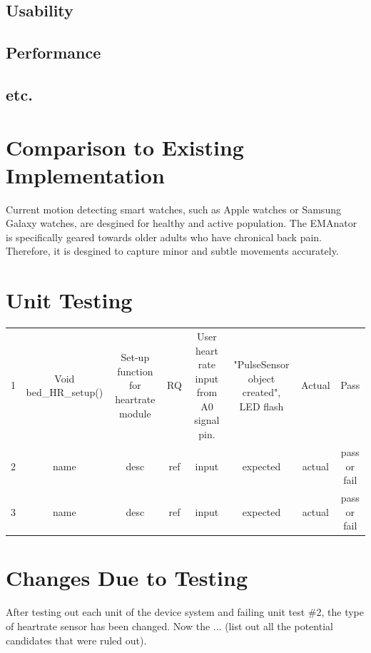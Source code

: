 \documentclass[12pt, titlepage]{article}
\begin{document}
\subsection{Usability}
		
\subsection{Performance}

\subsection{etc.}
	
\section{Comparison to Existing Implementation}	

Current motion detecting smart watches, such as Apple watches or Samsung Galaxy watches, are desgined for healthy and active population. The EMAnator is specifically geared towards older adults who have chronical back pain. Therefore, it is desgined to capture minor and subtle movements accurately.

\section{Unit Testing}

\begin{center}
\begin{tabular}{ c | c | c | c | c | c | c | c }
 1 & Void bed\_HR\_setup() & Set-up function for heartrate module & RQ & User heart rate input from A0 signal pin. & "PulseSensor object created", LED flash & Actual & Pass \\ 
2 & name & desc & ref & input & expected & actual & pass or fail \\  
3 & name & desc & ref & input & expected & actual & pass or fail \\  
\end{tabular}
\end{center}

\section{Changes Due to Testing}

After testing out each unit of the device system and failing unit test \#2, the type of heartrate sensor has been changed. Now the ... (list out all the potential candidates that were ruled out).\\
\end{document}
